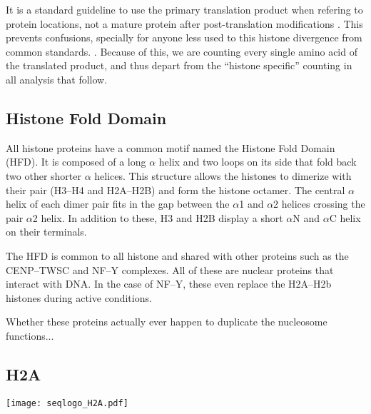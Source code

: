     It is a standard guideline to use the primary translation product when
    refering to protein locations, not a mature protein after
    post-translation modifications \citep{desc-seq-variant}.
    This prevents confusions, specially for anyone less
    used to this histone divergence from common standards.
    .
    Because of this, we are counting every single amino acid of the translated
    product, and thus depart from the ``histone specific'' counting in all
    analysis that follow.


  \subsection{Histone Fold Domain}

    All histone proteins have a common motif named the Histone Fold Domain (HFD).
    It is composed of a long $\alpha$ helix and two loops on its side that fold
    back two other shorter $\alpha$ helices. This structure allows the histones
    to dimerize with their pair (H3--H4 and H2A--H2B) and form the histone
    octamer. The central $\alpha$ helix of each dimer pair fits in the gap between
    the $\alpha$1 and $\alpha$2 helices crossing the pair $\alpha$2 helix. In
    addition to these, H3 and H2B display a short $\alpha$N and $\alpha$C helix
    on their terminals.

    The HFD is common to all histone and shared with other
    proteins such as the CENP--TWSC and NF--Y complexes. All of these are nuclear
    proteins that interact with DNA. In the case of NF--Y, these even replace
    the H2A--H2b histones during active conditions.

    Whether these proteins actually ever happen to duplicate the nucleosome functions...

  \subsection{H2A}
    \begin{TableAndFigure*}
      \label{tab:H2A-consensus}
      

      \texttt{[image: seqlogo\_H2A.pdf]}
      \label{fig:H2A-weblogo}
    \end{TableAndFigure*}

